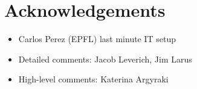 
\section*{Acknowledgements}

\begin{itemize}
\item Carlos Perez (EPFL) last minute IT setup
\item Detailed comments: Jacob Leverich, Jim Larus
\item High-level comments: Katerina Argyraki
\end{itemize}

